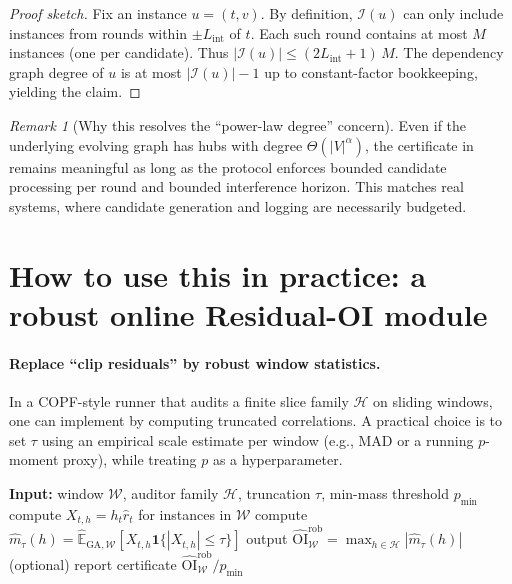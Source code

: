 \documentclass[11pt]{article}
\newcommand{\1}{\mathbf{1}}
\newcommand{\cH}{\mathcal{H}}
\newcommand{\cW}{\mathcal{W}}
\newcommand{\cI}{\mathcal{I}}
\newcommand{\abs}[1]{\left|#1\right|}
\newcommand{\Eb}{\widehat{\mathbb{E}}} %
\theoremstyle{plain}
\theoremstyle{definition}
\theoremstyle{remark}
\newtheorem{remark}[theorem]{Remark}
\newenvironment{proofsketch}{\begin{proof}[Proof sketch]}{\end{proof}}
\begin{document}
\begin{proofsketch}
Fix an instance $u=(t,v)$.
By definition, $\cI(u)$ can only include instances from rounds within $\pm L_{\mathrm{int}}$ of $t$.
Each such round contains at most $M$ instances (one per candidate).
Thus $\abs{\cI(u)}\le (2L_{\mathrm{int}}+1)\,M$.
The dependency graph degree of $u$ is at most $\abs{\cI(u)}-1$ up to constant-factor bookkeeping,
yielding the claim.
\end{proofsketch}

\begin{remark}[Why this resolves the ``power-law degree'' concern]
Even if the underlying evolving graph has hubs with degree $\Theta(|V|^\alpha)$,
the certificate in  remains meaningful as long as the protocol enforces
bounded candidate processing per round and bounded interference horizon.
This matches real systems, where candidate generation and logging are necessarily budgeted.
\end{remark}

\section{How to use this in practice: a robust online Residual-OI module}
\label{sec:practice}

\paragraph{Replace ``clip residuals'' by robust window statistics.}
In a COPF-style runner that audits a finite slice family $\cH$ on sliding windows,
one can implement  by computing truncated correlations.
A practical choice is to set $\tau$ using an empirical scale estimate per window
(e.g., MAD or a running $p$-moment proxy), while treating $p$ as a hyperparameter.

\begin{algorithm}[t]
\caption{Robust windowed Residual-OI (truncated correlations)}
\label{alg:robustoi}
\begin{algorithmic}[1]
\State \textbf{Input:} window $\cW$, auditor family $\cH$, truncation $\tau$, min-mass threshold $p_{\min}$
\For{each $h\in\cH$}
  \State compute $X_{t,h}=h_t\hat r_t$ for instances in $\cW$
  \State compute $\widehat m_{\tau}(h)=\Eb_{\mathrm{GA},\cW}[X_{t,h}\1\{\abs{X_{t,h}}\le \tau\}]$
\EndFor
\State output $\widehat{\mathrm{OI}}^{\mathrm{rob}}_{\cW}=\max_{h\in\cH}\abs{\widehat m_{\tau}(h)}$
\State (optional) report certificate $\widehat{\mathrm{OI}}^{\mathrm{rob}}_{\cW}/p_{\min}$
\end{algorithmic}
\end{algorithm}
\end{document}
